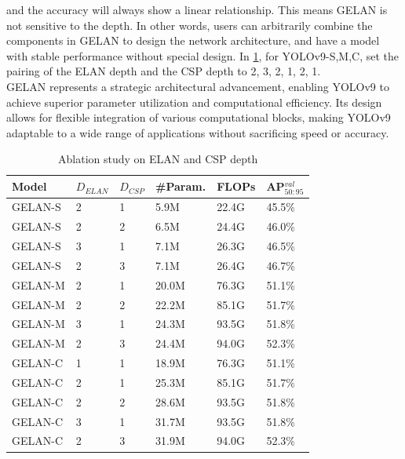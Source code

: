             and the accuracy will always show a linear relationship.
            This means GELAN is not sensitive to the depth.
            In other words, users can arbitrarily combine the components
            in GELAN to design the network architecture, and
            have a model with stable performance without special design.
            In \ref{tab:ELAN-CSP}, for YOLOv9-{S,M,C}, set the pairing
            of the ELAN depth and the CSP depth to {{2, 3}, {2, 1},
            {2, 1}}. \\
            \vspace{3mm}
            GELAN represents a strategic architectural advancement, enabling YOLOv9 to achieve superior parameter utilization and computational efficiency. Its design allows for flexible integration of various computational blocks, making YOLOv9 adaptable to a wide range of applications without sacrificing speed or accuracy.
            \begin{table}[ht]
                \centering
                \begin{tabular}{| l | l | l | l | l | l |}
                    \hline
                    \rowcolor{lightgray} Model & $D_{ELAN}$ & $D_{CSP}$ & \#Param. & FLOPs & AP${^{val}_{50:95}}$ \\ \hline
                    GELAN-S & 2 & 1 & 5.9M & 22.4G & 45.5\% \\ 
                    GELAN-S & 2 & 2 & 6.5M & 24.4G & 46.0\% \\ 
                    GELAN-S & 3 & 1 & 7.1M & 26.3G & 46.5\% \\ 
                    GELAN-S & 2 & 3 & 7.1M & 26.4G & 46.7\% \\ \hline
                    GELAN-M & 2 & 1 & 20.0M & 76.3G & 51.1\% \\ 
                    GELAN-M & 2 & 2 & 22.2M & 85.1G & 51.7\% \\ 
                    GELAN-M & 3 & 1 & 24.3M & 93.5G & 51.8\% \\ 
                    GELAN-M & 2 & 3 & 24.4M & 94.0G & 52.3\% \\ \hline
                    GELAN-C & 1 & 1 & 18.9M & 76.3G & 51.1\% \\ 
                    GELAN-C & 2 & 1 & 25.3M & 85.1G & 51.7\% \\ 
                    GELAN-C & 2 & 2 & 28.6M & 93.5G & 51.8\% \\
                    GELAN-C & 3 & 1 & 31.7M & 93.5G & 51.8\% \\
                    GELAN-C & 2 & 3 & 31.9M & 94.0G & 52.3\% \\ \hline
                \end{tabular}
                \caption{Ablation study on ELAN and CSP depth}
                \label{tab:ELAN-CSP}
            \end{table}
